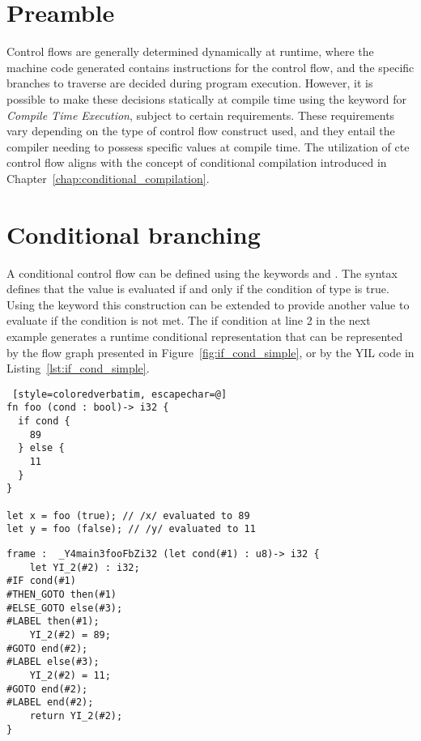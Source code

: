 \section{Preamble}

Control flows are generally determined dynamically at runtime, where the machine
code generated contains instructions for the control flow, and the specific
branches to traverse are decided during program execution. However, it is
possible to make these decisions statically at compile time using the keyword
 for \textit{Compile Time Execution}, subject to certain
requirements. These requirements vary depending on the type of control flow
construct used, and they entail the compiler needing to possess specific values
at compile time. The utilization of cte control flow aligns with the concept of
conditional compilation introduced in
Chapter~\ref{chap:conditional_compilation}.

\section{Conditional branching}%
\label{sec:if_else}

A conditional control flow can be defined using the keywords  and
. The syntax  defines that the value  is
evaluated if and only if the condition  of type  is true.
Using the keyword  this construction can be extended to provide
another value to evaluate if the condition is not met. The if condition at line
2 in the next example generates a runtime conditional representation that can be
represented by the flow graph presented in Figure~\ref{fig:if_cond_simple}, or
by the YIL code in Listing~\ref{lst:if_cond_simple}.

\begin{lstlisting} [style=coloredverbatim, escapechar=@]
fn foo (cond : bool)-> i32 {
  if cond {
    89
  } else {
    11
  }
}

let x = foo (true); // /x/ evaluated to 89
let y = foo (false); // /y/ evaluated to 11
\end{lstlisting}


\begin{lstlisting}[style=intermediateVerb, caption=Simple condition, label=lst:if_cond_simple]
frame :  _Y4main3fooFbZi32 (let cond(#1) : u8)-> i32 {
    let YI_2(#2) : i32;
#IF cond(#1)
#THEN_GOTO then(#1)
#ELSE_GOTO else(#3);
#LABEL then(#1);
    YI_2(#2) = 89;
#GOTO end(#2);
#LABEL else(#3);
    YI_2(#2) = 11;
#GOTO end(#2);
#LABEL end(#2);
    return YI_2(#2);
}
\end{lstlisting}

